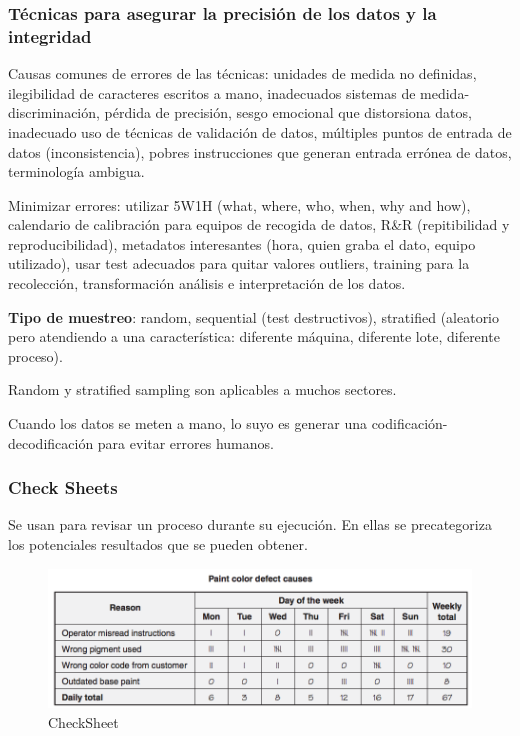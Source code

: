 \documentclass[]{article}
\begin{document}
\subsubsection{Técnicas para asegurar la precisión de los datos y la integridad}

Causas comunes de errores de las técnicas: unidades de medida no definidas, ilegibilidad de caracteres escritos a mano, inadecuados sistemas de medida-discriminación, pérdida de precisión, sesgo emocional que distorsiona datos, inadecuado uso de técnicas de validación de datos, múltiples puntos de entrada de datos (inconsistencia), pobres instrucciones que generan entrada errónea de datos, terminología ambigua.

Minimizar errores: utilizar 5W1H (what, where, who, when, why and how), calendario de calibración para equipos de recogida de datos, R\&R (repitibilidad y reproducibilidad), metadatos interesantes (hora, quien graba el dato, equipo utilizado), usar test adecuados para quitar valores outliers, training para la recolección, transformación análisis e interpretación de los datos.

\textbf{Tipo de muestreo}: random, sequential (test destructivos), stratified (aleatorio pero atendiendo a una característica: diferente máquina, diferente lote, diferente proceso).

Random y stratified sampling son aplicables a muchos sectores.

Cuando los datos se meten a mano, lo suyo es generar una codificación-decodificación para evitar errores humanos.

\subsubsection{Check Sheets}

Se usan para revisar un proceso durante su ejecución. En ellas se precategoriza los potenciales resultados que se pueden obtener.

\begin{figure}[ht!]
	\centering
	\includegraphics[width=120mm]{imagenes/CheckSheet.png}
	\caption{CheckSheet}
\end{figure}
\end{document}
